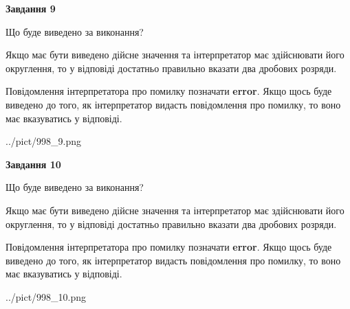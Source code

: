 \documentclass[12pt, ukrainian]{article}
\begin{document}
{\begin {Large}
{\begin {center}\textbf{Завдання 9}\end {center}}\par
Що буде виведено за виконання? \par

Якщо має бути виведено дійсне значення та інтерпретатор має здійснювати його округлення, 
то у відповіді достатньо правильно вказати два дробових розряди.

Повідомлення інтерпретатора про помилку позначати \textbf{error}.
Якщо щось буде виведено до того, як інтерпретатор видасть повідомлення про помилку, 
то воно має вказуватись у відповіді. \par

\begin{center}
	{../pict/998_9.png}
\end{center}
\newpage

{\begin {center}\textbf{Завдання 10}\end {center}}\par
Що буде виведено за виконання? \par

Якщо має бути виведено дійсне значення та інтерпретатор має здійснювати його округлення, 
то у відповіді достатньо правильно вказати два дробових розряди.

Повідомлення інтерпретатора про помилку позначати \textbf{error}.
Якщо щось буде виведено до того, як інтерпретатор видасть повідомлення про помилку, 
то воно має вказуватись у відповіді. \par

\begin{center}
	{../pict/998_10.png}
\end{center}
\newpage

\end {Large}}
\end{document}
